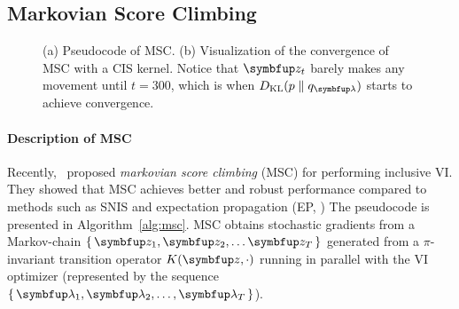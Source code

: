 \subsection{Markovian Score Climbing}\label{section:msc}
%
\begin{figure}[H]
  \vspace{-0.01in}
  \small
  \centering
  \subfloat[]{
      \label{fig:motivating}
  }
  \caption{(a) Pseudocode of MSC. (b) Visualization of the convergence of MSC with a CIS kernel.
    Notice that \(\vz_t\) barely makes any movement until \(t=300\), which is when \(\DKL{p}{q_{\vlambda}}\) starts to achieve convergence.}
\end{figure}
%
%
\paragraph{Description of MSC}
Recently,~\citet{NEURIPS2020_b2070693} proposed \textit{markovian score climbing} (MSC) for performing inclusive VI.
They showed that MSC achieves better and robust performance compared to methods such as SNIS and expectation propagation (EP, \citealt{10.5555/2074022.2074067})
The pseudocode is presented in Algorithm~\ref{alg:msc}.
MSC obtains stochastic gradients from a Markov-chain \(\{\,\vz_1, \vz_2, \ldots \vz_T\,\}\) generated from a \(\pi\)-invariant transition operator \(K(\vz, \cdot)\) running in parallel with the VI optimizer (represented by the sequence \(\{\,\vlambda_1, \vlambda_2, \ldots, \vlambda_T\,\}\)).

